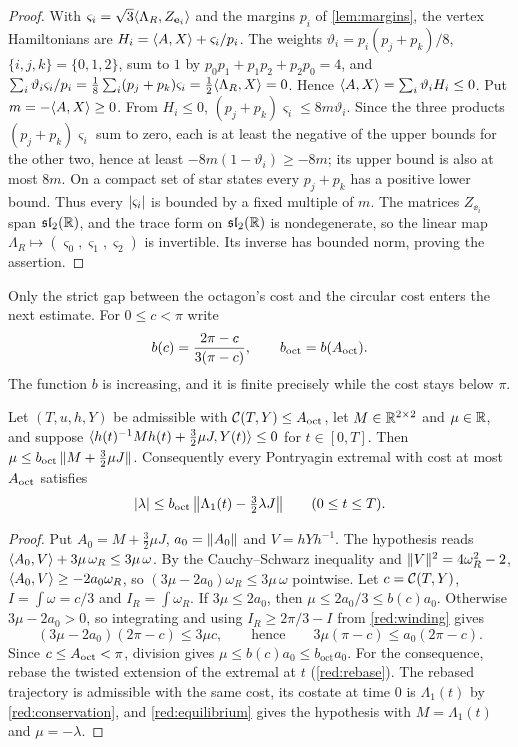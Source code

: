 \begin{proof}
With $\varsigma_i=\sqrt3\langle \Lambda_R,Z_{\mathbf{e}_i}\rangle$ and the margins $p_i$ of \cref{lem:margins}, the
vertex Hamiltonians are $H_i=\langle A,X\rangle+\varsigma_i/p_i$. The weights $\vartheta_i=p_i(p_j+p_k)/8$,
$\{i,j,k\}=\{0,1,2\}$, sum to $1$ by $p_0p_1+p_1p_2+p_2p_0=4$, and
$\sum_i\vartheta_i\varsigma_i/p_i=\frac18\sum_i(p_j+p_k)\varsigma_i
=\frac12\langle \Lambda_R,X\rangle=0$. Hence $\langle A,X\rangle=\sum_i\vartheta_iH_i\le0$. Put $m=-\langle A,X\rangle\ge0$. From
$H_i\le0$, $(p_j+p_k)\varsigma_i\le8m\vartheta_i$. Since the three products
$(p_j+p_k)\varsigma_i$ sum to zero, each is at least the negative of the upper bounds for the
other two, hence at least $-8m(1-\vartheta_i)\ge-8m$; its upper bound is also at most $8m$.
On a compact set of star states every $p_j+p_k$ has a positive lower bound. Thus every
$\lvert \varsigma_i\rvert$ is bounded by a fixed multiple of $m$. The matrices $Z_{\ee_i}$ span
$\mathfrak{sl}_2(\mathbb{R})$, and the trace form on $\mathfrak{sl}_2(\mathbb{R})$ is nondegenerate, so the linear map
$\Lambda_R\mapsto(\varsigma_0,\varsigma_1,\varsigma_2)$ is invertible. Its inverse has bounded
norm, proving the assertion.
\end{proof}

Only the strict gap between the octagon's cost and the circular cost enters the next estimate.
For $0\le c<\pi$ write
\[
 b(c)=\frac{2\pi-c}{3(\pi-c)},\qquad b_{\mathrm{oct}}=b(A_{\mathrm{oct}}).
\]
The function $b$ is increasing, and it is finite precisely while the cost stays below $\pi$.

\begin{proposition}\label{red:budget}
Let $(T,u,h,Y)$ be admissible with $\mathcal{C}(T,Y)\le A_{\mathrm{oct}}$, let $M\in\mathbb{R}^{2\times2}$ and $\mu\in\mathbb{R}$, and
suppose $\langle h(t)^{-1}Mh(t)+\frac32\mu J,Y(t)\rangle\le0$ for $t\in[0,T]$. Then
$\mu\le b_{\mathrm{oct}}\,\lVert M+\frac32\mu J\rVert$. Consequently every Pontryagin
extremal with cost at most $A_{\mathrm{oct}}$ satisfies
\[
\lvert \lambda\rvert\le b_{\mathrm{oct}}\,\bigl\lVert\Lambda_1(t)-\tfrac32\lambda J\bigr\rVert
\qquad(0\le t\le T).
\]
\end{proposition}

\begin{proof}
Put $A_0=M+\frac32\mu J$, $a_0=\lVert A_0\rVert$ and $V=hYh^{-1}$. The hypothesis reads
$\langle A_0,V\rangle+3\mu\,\omega_R\le3\mu\,\omega$. By the Cauchy--Schwarz inequality and
$\lVert V\rVert^2=4\omega_R^2-2$, $\langle A_0,V\rangle\ge-2a_0\omega_R$, so
$(3\mu-2a_0)\omega_R\le3\mu\,\omega$ pointwise. Let $c=\mathcal{C}(T,Y)$,
$I=\int\omega=c/3$ and $I_R=\int\omega_R$. If $3\mu\le2a_0$, then
$\mu\le2a_0/3\le b(c)a_0$. Otherwise $3\mu-2a_0>0$, so integrating and using
$I_R\ge2\pi/3-I$ from \cref{red:winding} gives
\[
 (3\mu-2a_0)(2\pi-c)\le3\mu c,
 \qquad\text{hence}\qquad
 3\mu(\pi-c)\le a_0(2\pi-c).
\]
Since $c\le A_{\mathrm{oct}}<\pi$, division gives $\mu\le b(c)a_0\le b_{\mathrm{oct}}a_0$.
For the consequence, rebase
the twisted extension of the extremal at $t$ (\cref{red:rebase}). The rebased trajectory is
admissible with the same cost, its costate at time $0$ is $\Lambda_1(t)$ by \cref{red:conservation},
and \cref{red:equilibrium} gives the hypothesis with $M=\Lambda_1(t)$ and $\mu=-\lambda$.
\end{proof}


